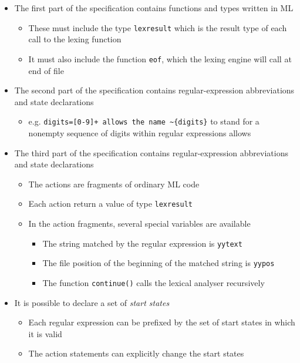 \documentclass[11pt]{article}
\begin{document}
\begin{itemize}
\item The first part of the specification contains functions and types written in ML
\begin{itemize}
\item These must include the type \texttt{lexresult} which is the result type of each call to the lexing function
\item It must also include the function \texttt{eof}, which the lexing engine will call at end of file
\end{itemize}

\item The second part of the specification contains regular-expression abbreviations and state declarations
\begin{itemize}
\item e.g. \texttt{digits=[0-9]+ allows the name \textasciitilde{}\{digits\}} to stand for a nonempty sequence of digits within regular expressions allows
\end{itemize}

\item The third part of the specification contains regular-expression abbreviations and state declarations
\begin{itemize}
\item The actions are fragments of ordinary ML code
\item Each action return a value of type \texttt{lexresult}
\item In the action fragments, several special variables are available
\begin{itemize}
\item The string matched by the regular expression is \texttt{yytext}
\item The file position of the beginning of the matched string is \texttt{yypos}
\item The function \texttt{continue()} calls the lexical analyser recursively
\end{itemize}
\end{itemize}

\item It is possible to declare a set of \emph{start states}
\begin{itemize}
\item Each regular expression can be prefixed by the set of start states in which it is valid
\item The action statements can explicitly change the start states
\end{itemize}
\end{itemize}
\end{document}
